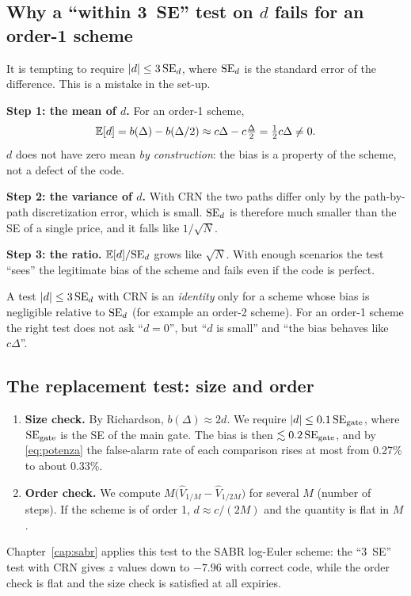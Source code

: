 \subsection{\texorpdfstring{Why a ``within 3~SE'' test on $d$ fails for an order-1 scheme}{Why a ``within 3 SE'' test on d fails for an order-1 scheme}}
It is tempting to require $|d|\le3\,\mathrm{SE}_d$, where $\mathrm{SE}_d$ is the standard error of the difference. This is a mistake
in the set-up.

\textbf{Step 1: the mean of $d$.} For an order-1 scheme,
\[
\mathbb{E}[d]=b(\Delta)-b(\Delta/2)\approx c\Delta-c\tfrac\Delta2=\tfrac12c\Delta\ne0 .
\]
$d$ does not have zero mean \emph{by construction}: the bias is a property of the scheme, not a defect of the code.

\textbf{Step 2: the variance of $d$.} With CRN the two paths differ only by the path-by-path discretization error,
which is small. $\mathrm{SE}_d$ is therefore much smaller than the SE of a single price, and it falls like $1/\sqrt N$.

\textbf{Step 3: the ratio.} $\mathbb{E}[d]/\mathrm{SE}_d$ grows like $\sqrt N$. With enough scenarios the test ``sees'' the
legitimate bias of the scheme and fails even if the code is perfect.

\begin{idea}
A test $|d|\le3\,\mathrm{SE}_d$ with CRN is an \emph{identity} only for a scheme whose bias is negligible relative to
$\mathrm{SE}_d$ (for example an order-2 scheme). For an order-1 scheme the right test does not ask ``$d=0$'', but ``$d$ is
small'' and ``the bias behaves like $c\Delta$''.
\end{idea}

\subsection{The replacement test: size and order}
\begin{enumerate}
\item \textbf{Size check.} By Richardson, $b(\Delta)\approx2d$. We require $|d|\le0.1\,\mathrm{SE}_{\text{gate}}$, where
$\mathrm{SE}_{\text{gate}}$ is the SE of the main gate. The bias is then $\lesssim0.2\,\mathrm{SE}_{\text{gate}}$, and by
\eqref{eq:potenza} the false-alarm rate of each comparison rises at most from 0.27\% to about 0.33\%.
\item \textbf{Order check.} We compute $M\big(\hat V_{1/M}-\hat V_{1/2M}\big)$ for several $M$ (number of steps). If
the scheme is of order 1, $d\approx c/(2M)$ and the quantity is flat in $M$.
\end{enumerate}
Chapter~\ref{cap:sabr} applies this test to the SABR log-Euler scheme: the ``3~SE'' test with CRN gives $z$ values
down to $-7.96$ with correct code, while the order check is flat and the size check is satisfied at all expiries.

